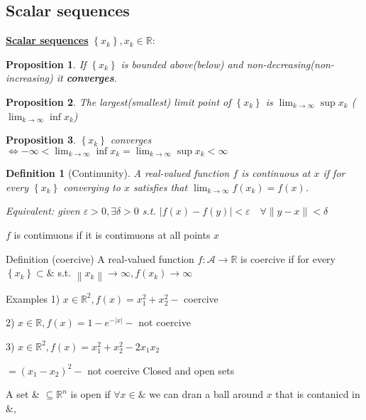 \documentclass[11pt,a4paper]{article}
\newtheorem{definition}{Definition}
\newtheorem{proposition}{Proposition}
\begin{document}
\subsection{Scalar sequences}
\textbf{\underline{Scalar sequences}} $\left\{x_{k}\right\}, x_{k} \in \mathbb{R}$:
\begin{proposition}
    If $\left\{x_{k}\right\}$ is bounded above(below) and non-decreasing(non-increasing) it \textbf{converges}.
\end{proposition}

\begin{proposition}
    The largest(smallest) limit point of $\left\{x_{k}\right\}$ is $\lim _{k \rightarrow \infty}\sup x_{k}$ ($\lim _{k \rightarrow \infty}\inf x_{k}$)
\end{proposition}

\begin{proposition}
    $\left\{x_{k}\right\}$ converges $\Longleftrightarrow-\infty<\lim _{k \rightarrow \infty} \inf x_{k}=\lim _{k \rightarrow \infty}\sup x_{k}<\infty$
\end{proposition}

\begin{definition}[Continunity]
    \quad
    
    A real-valued function $f$ is continuous at $x$ if for every $\left\{x_{k}\right\}$ converging to $x$ satisfies that $\lim _{k \rightarrow \infty} f\left(x_{k}\right)=f(x)$.

    Equivalent: given $\varepsilon>0, \exists \delta>0$ s.t.
    $|f(x)-f(y)|<\varepsilon \quad \forall\|y-x\|<\delta$

\end{definition}

$f$ is contimuons if it is contimuons at all points $x$

Definition (coercive) A real-valued function $f: \mathcal{A} \rightarrow \mathbb{R}$ is coercive if for every $\left\{x_{k}\right\} \subset \&$ s.t. $\left\|x_{k}\right\| \rightarrow \infty, f\left(x_{k}\right) \rightarrow \infty$

Examples 1) $x \in \mathbb{R}^{2}, f(x)=x_{1}^{2}+x_{2}^{2}-$ coercive

2) $x \in \mathbb{R}, f(x)=1-e^{-|x|}-$ not coercive

3) $x \in \mathbb{R}^{2}, f(x)=x_{1}^{2}+x_{2}^{2}-2 x_{1} x_{2}$

$=\left(x_{1}-x_{2}\right)^{2}-$ not coercive Closed and open sets

A set \& $\subseteq \mathbb{R}^{n}$ is open if $\forall x \in \&$ we can dran a ball around $x$ that is contanicd in $\&$,
\end{document}
